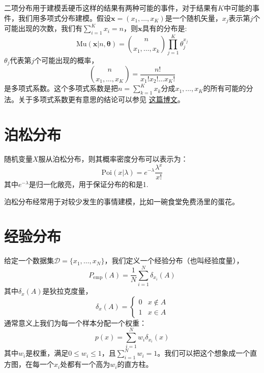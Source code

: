 \documentclass[10pt,a4paper,UTF8]{article}
\begin{document}
二项分布用于建模丢硬币这样的结果有两种可能的事件，对于结果有\(K\)中可能的事件，我们用多项式分布建模。假设\(\mathbf{x} = (x_{1},\ldots ,x_{K})\)是一个随机矢量，\(x_{j}\)表示第\(j\)个可能出现的次数，我们有\(\sum_{i=1}^{K}x_{i} = n\)，则\(\mathbf{x}\)具有的分布是:
\begin{equation}
\label{eq:4}
\mathrm{Mu}(\mathbf{x}| n, \mathbf{\theta}) = \binom{n}{x_{1},\ldots ,x_{k}}\prod_{j=1}^{K}\theta_{j}^{x_{j}}
\end{equation}
\(\theta_{j}\)代表第\(j\)个可能出现的概率，
\begin{equation}
\label{eq:5}
\binom{n}{x_{1},\ldots ,x_{K}} = \frac{n!}{x_{1}!x_{2}!\ldots x_{K}!}
\end{equation}
是多项式系数。这个多项式系数是把\(n=\sum_{k=1}^{K}x_{k}\)分成\(x_{1},\ldots ,x_{K}\)的所有可能的分法。关于多项式系数更有意思的结论可以参见 \href{file:///c:/Users/cliyh/AppData/Roaming/zorg/output/math/probability/afcp-01dot5-multinomial-coefficients.org}{这篇博文}。
\section{泊松分布}
\label{sec:org93cd715}


随机变量\(X\)服从泊松分布，则其概率密度分布可以表示为：
\begin{equation}
\label{eq:6}
\mathrm{Poi}(x|\lambda) = e^{-\lambda} \frac{\lambda^{x}}{x!}
\end{equation}
其中\(e^{-\lambda}\)是归一化敞亮，用于保证分布的和是1.

泊松分布经常用于对较少发生的事情建模，比如一碗食堂免费汤里的蛋花。
\section{经验分布}
\label{sec:orga419cb6}


给定一个数据集\(\mathcal{D} = \{x_{1},\ldots ,x_{N}\}\)，我们定义一个经验分布（也叫经验度量），
\begin{equation}
\label{eq:7}
P_{\mathrm{emp}}(A) = \frac{1}{N} \sum_{i=1}^{N}\delta_{x_{i}} (A)
\end{equation}
其中\(\delta_{x}(A)\)是狄拉克度量，
\begin{equation}
\label{eq:8}
\delta_{x}(A) =
\begin{cases}
0 & x\notin A \\
1 & x\in A
\end{cases}
\end{equation}
通常意义上我们为每一个样本分配一个权重：
\begin{equation}
\label{eq:9}
p(x) = \sum_{i=1}^{N}w_{i}\delta_{x_{i}}(x)
\end{equation}
其中\(w_{i}\)是权重，满足\(0\leq w_{i} \leq 1\)，且\(\sum_{i=1}^{N}w_{i} = 1\)。我们可以把这个想象成一个直方图，在每一个\(x_{i}\)处都有一个高为\(w_{i}\)的直方柱。
\end{document}
